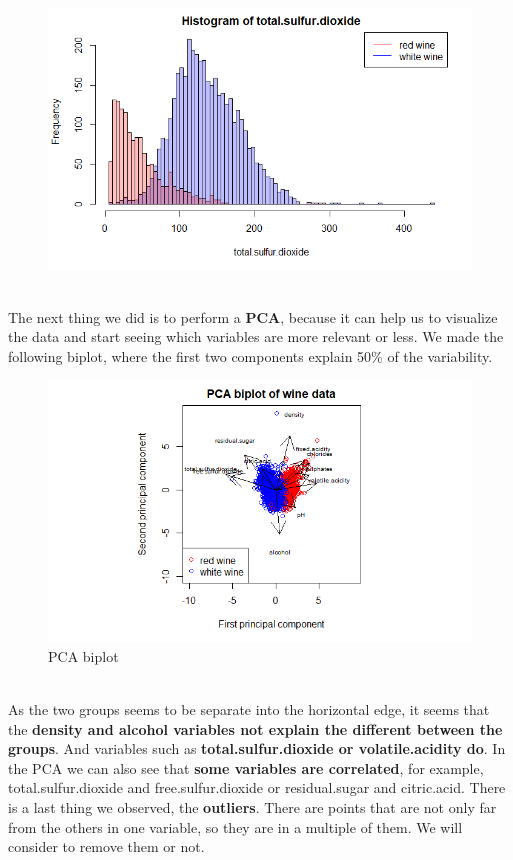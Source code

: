 \documentclass[10pt]{article}
\begin{document}
\begin{figure}[H]
\includegraphics[scale=0.4]{histogram_of_totalsulfurdioxide}
\end{figure}
\ \\
The next thing we did is to perform a \textbf{PCA}, because it can help us to visualize the data and start seeing which variables are more relevant or less. We made the following biplot, where the first two components explain 50\% of the variability. \\
\begin{figure}[H]
\centering
\caption{PCA biplot}
\includegraphics[scale=0.75]{PCA_biplot}
\end{figure}
\ \\
As the two groups seems to be separate into the horizontal edge, it seems that the \textbf{density and alcohol variables not explain the different between the groups}. And variables such as \textbf{total.sulfur.dioxide or volatile.acidity do}. In the PCA we can also see that \textbf{some variables are correlated}, for example, total.sulfur.dioxide and free.sulfur.dioxide or residual.sugar and citric.acid. There is a last thing we observed, the \textbf{outliers}. There are points that are not only far from the others in one variable, so they are in a multiple of them. We will consider to remove them or not.   \\ \ \\
\end{document}

